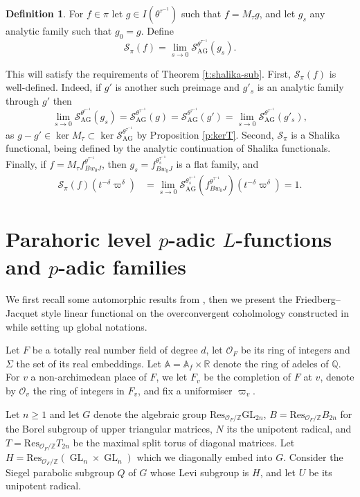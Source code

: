 \documentclass{amsart}
\theoremstyle{definition}
\newtheorem{definition}[thm]{Definition}
\newcommand{\A}{\mathbb{A}}
\newcommand{\Q}{\mathbb{Q}}
\newcommand{\R}{\mathbb{R}}
\newcommand{\Z}{\mathbb{Z}}
\newcommand{\cO}{\mathcal{O}}
\newcommand{\GL}{\operatorname{GL}}
\newcommand{\AG}{\operatorname{AG}}
\begin{document}
{\begin{definition}
For $f\in \pi$ let $g\in I(\theta^{\tau^{-1}})$ such that
$f=M_\tau g$, and let $g_s$ any analytic family such that
$g_0=g$. Define
\[\mathcal{S}_\pi(f)=\lim_{s\to 0}\mathcal{S}_{\AG}^{\theta^{\tau^{-1}}}(g_s).\]
\end{definition}
This will satisfy the requirements of Theorem
\ref{t:shalika-sub}. First, $\mathcal{S}_\pi(f)$ is
well-defined. Indeed, if $g'$ is another such preimage and
$g'_s$ is an analytic family through $g'$ then
\[\lim_{s\to
  0}\mathcal{S}_{\AG}^{\theta^{\tau^{-1}}}(g_s)=\mathcal{S}_{\AG}^{\theta^{\tau^{-1}}}(g)=\mathcal{S}_{\AG}^{\theta^{\tau^{-1}}}(g')=\lim_{s\to
  0}\mathcal{S}_{\AG}^{\theta^{\tau^{-1}}}(g'_s),\]
as $g-g'\in \ker M_{\tau}\subset \ker \mathcal{S}_{\AG}^{\theta^{\tau^{-1}}}$ by Proposition \ref{p:kerT}. Second, $\mathcal{S}_\pi$ is a Shalika functional, being defined by the analytic continuation of Shalika functionals. Finally, 
if $f=M_\tau f_{Bw_0J}^{\theta^{\tau^{-1}}}$, then
$g_s=f_{Bw_0J}^{\theta_s^{\tau^{-1}}}$ is a flat family,
and
\begin{align*}
\mathcal{S}_\pi(f)(t^{-\delta}\varpi^\delta )&=\lim_{s\to 0}\mathcal{S}_{\AG}^{\theta_s^{\tau^{-1}}}(f_{Bw_0J}^{\theta^{\tau^{-1}}})(t^{-\delta}\varpi^\delta )=1.
\end{align*}

\section{Parahoric level $p$-adic $L$-functions and $p$-adic families}\label{s3}




We first  recall some automorphic results from \cite{DJR}, then we present the Friedberg--Jacquet style linear functional on the overconvergent coholmology constructed in \cite{BDW} while setting up global notations. 


Let $F$ be a totally real number field of degree $d$, let $\cO_F$ be its ring of integers and $\Sigma$ the set of its real embeddings. Let $\A = \A_f\times \R$ denote the ring of adeles of $\Q$. For  $v$  a non-archimedean place of $F$, we let $F_v$ be the completion of $F$ at $v$, denote by $\cO_v$ the ring of integers in $F_v$, and fix a uniformiser $\varpi_v$. 

Let $n \geqslant 1$ and let $G$ denote the algebraic group $\mathrm{Res}_{\cO_F/\Z}\mathrm{GL}_{2n}$, $B= \mathrm{Res}_{\cO_F/\Z}B_{2n}$ for the Borel subgroup of upper triangular matrices, $N$ its the unipotent radical, and $T= \mathrm{Res}_{\cO_F/\Z}T_{2n}$ be the maximal split torus of diagonal matrices.  
Let $H=\mathrm{Res}_{\cO_F/\Z}(\GL_n \times \GL_n)$ which we diagonally embed into   $G$. 
Consider the  Siegel parabolic subgroup $Q$ of $G$  whose Levi subgroup is $H$, and let $U$ be its  unipotent radical. 


}
\end{document}
